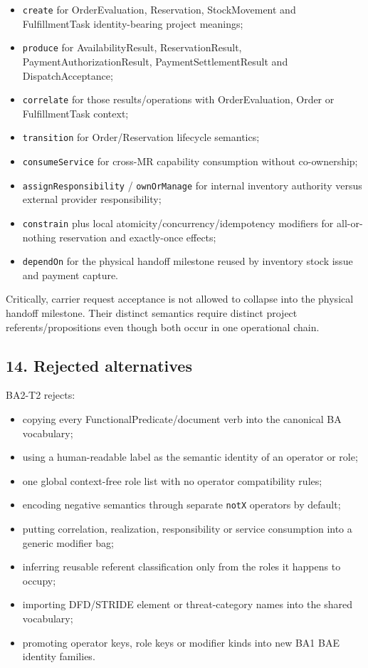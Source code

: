 \documentclass[
  10pt,
  letterpaper,
]{article}
\providecommand{\tightlist}{%
  \setlength{\itemsep}{0pt}\setlength{\parskip}{0pt}}
\begin{document}
\begin{itemize}
\tightlist
\item
  \texttt{create} for OrderEvaluation, Reservation, StockMovement and
  FulfillmentTask identity-bearing project meanings;
\item
  \texttt{produce} for AvailabilityResult, ReservationResult,
  PaymentAuthorizationResult, PaymentSettlementResult and
  DispatchAcceptance;
\item
  \texttt{correlate} for those results/operations with OrderEvaluation,
  Order or FulfillmentTask context;
\item
  \texttt{transition} for Order/Reservation lifecycle semantics;
\item
  \texttt{consumeService} for cross-MR capability consumption without
  co-ownership;
\item
  \texttt{assignResponsibility} / \texttt{ownOrManage} for internal
  inventory authority versus external provider responsibility;
\item
  \texttt{constrain} plus local atomicity/concurrency/idempotency
  modifiers for all-or-nothing reservation and exactly-once effects;
\item
  \texttt{dependOn} for the physical handoff milestone reused by
  inventory stock issue and payment capture.
\end{itemize}

Critically, carrier request acceptance is not allowed to collapse into
the physical handoff milestone. Their distinct semantics require
distinct project referents/propositions even though both occur in one
operational chain.

\subsection{14. Rejected alternatives}\label{rejected-alternatives}

BA2-T2 rejects:

\begin{itemize}
\tightlist
\item
  copying every FunctionalPredicate/document verb into the canonical BA
  vocabulary;
\item
  using a human-readable label as the semantic identity of an operator
  or role;
\item
  one global context-free role list with no operator compatibility
  rules;
\item
  encoding negative semantics through separate \texttt{notX} operators
  by default;
\item
  putting correlation, realization, responsibility or service
  consumption into a generic modifier bag;
\item
  inferring reusable referent classification only from the roles it
  happens to occupy;
\item
  importing DFD/STRIDE element or threat-category names into the shared
  vocabulary;
\item
  promoting operator keys, role keys or modifier kinds into new BA1 BAE
  identity families.
\end{itemize}
\end{document}

